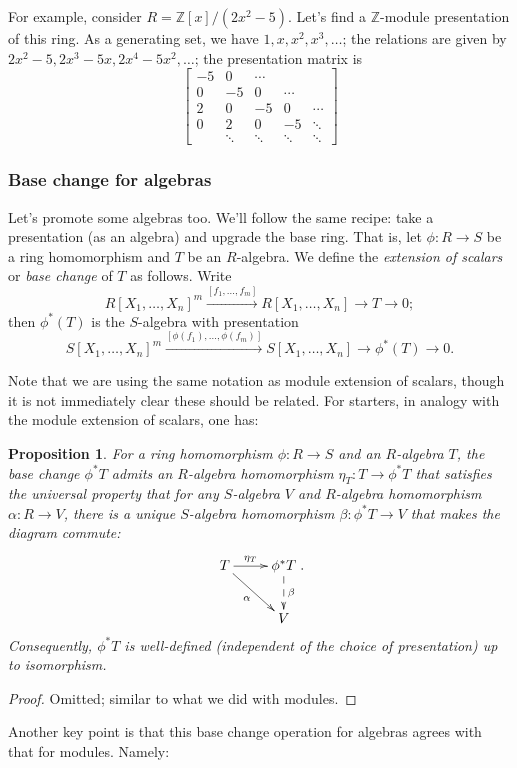 \documentclass{amsart}[12pt]
\newcommand{\Z}{\mathbb{Z}}
\numberwithin{equation}{section}
\theoremstyle{plain} %
\newtheorem{prop}[equation]{Proposition}
\theoremstyle{definition}
\theoremstyle{remark}
\newcommand{\sssec}[1]{\subsubsection{#1}}
\newcommand{\xra}[1]{\xrightarrow{#1}}
\begin{document}
For example, consider $R=\Z[x]/(2x^2-5)$. Let's find a $\Z$-module presentation of this ring. As a generating set, we have $1,x,x^2,x^3,\dots$; the relations are given by $2x^2-5, 2x^3 -5x, 2x^4-5x^2, \dots$; the presentation matrix is
\[ \begin{bmatrix} 
-5 & 0 & \cdots & & \\
0 & -5 & 0 & \cdots & \\
2 & 0 & -5 & 0 & \cdots \\
0 & 2 & 0 & -5 & \ddots \\
& \ddots & \ddots & \ddots & \ddots \end{bmatrix}\]



\sssec{Base change for algebras}


Let's promote some algebras too. We'll follow the same recipe: take a presentation (as an algebra) and upgrade the base ring. That is, let $\phi:R\to S$ be a ring homomorphism and $T$ be an $R$-algebra. We define the \emph{extension of scalars} or \emph{base change} of $T$ as follows. Write
\[ R[X_1,\dots,X_n]^{m} \xra{[f_1,\dots,f_m]} R[X_1,\dots,X_n] \to T \to 0;\]
then $\phi^*(T)$ is the $S$-algebra with presentation
\[ S[X_1,\dots,X_n]^{m} \xra{[\phi(f_1),\dots,\phi(f_m)]} S[X_1,\dots,X_n] \to \phi^*(T) \to 0.\]

Note that we are using the same notation as module extension of scalars, though it is not immediately clear these should be related. For starters, in analogy with the module extension of scalars, one has:

\begin{prop} For a ring homomorphism $\phi:R\to S$ and an $R$-algebra $T$, the base change $\phi^*T$ 
admits an $R$-algebra homomorphism $\eta_T: T\to \phi^*T$ that satisfies the universal property that for any $S$-algebra $V$ and $R$-algebra homomorphism $\alpha:R\to V$, there is a unique $S$-algebra homomorphism $\beta: \phi^*T\to V$ that makes the diagram commute:
\[  \xymatrix{  T \ar[r]^-{\eta_T} \ar[dr]_-{\alpha} & \phi^*T \ar@{-->}[d]^-{\beta} \\ & V}.\]
Consequently, $\phi^*T$ is well-defined (independent of the choice of presentation) up to isomorphism.
\end{prop}
\begin{proof} Omitted; similar to what we did with modules.
\end{proof}

Another key point is that this base change operation for algebras agrees with that for modules. Namely:
\end{document}
